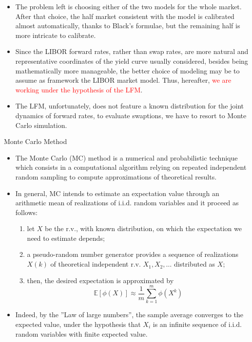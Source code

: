 \documentclass{beamer}
\begin{document}
\begin{frame}
  \begin{itemize}
  \item The problem left is choosing either of the two models for the whole market. After that choice, the half market consistent with the model is calibrated almost automatically, thanks to Black’s formulae, but the remaining half is more intricate to calibrate.
  \item Since the LIBOR forward rates, rather than swap rates, are more natural and representative coordinates of the yield curve usually considered, besides being mathematically more manageable, the better choice of modeling may be to assume as framework the LIBOR market model. Thus, hereafter, \textcolor{red}{we are working under the hypothesis of the LFM}.
  \item The LFM, unfortunately, does not feature a known distribution for the joint dynamics of forward rates, to evaluate swaptions, we have to resort to Monte Carlo simulation.%
  \end{itemize}
\end{frame}

\begin{frame}{Monte Carlo Method}
  \begin{itemize}
  \item The Monte Carlo (MC) method is a numerical and probabilistic technique which consists in a computational algorithm relying on repeated independent random sampling to compute approximations of theoretical results.
  \item In general, MC intends to estimate an expectation value through an arithmetic mean of realizations of i.i.d. random variables and it proceed as follows: 
    \begin{enumerate}
    \item let $X$ be the r.v., with known distribution, on which the expectation we need to estimate depends;
    \item a pseudo-random number generator provides a sequence of realizations $X(k)$ of theoretical independent r.v. $X_1, X_2,\ldots$ distributed as $X$;
    \item then, the desired expectation is approximated by
      \begin{equation*}
	\mathbb{E}[\phi(X)] \approx \frac{1}{m}\sum_{k=1}^m\phi(X^k)
      \end{equation*}
    \end{enumerate}
  \item Indeed, by the ”Law of large numbers”, the sample average converges to the expected value, under the hypothesis that $X_i$ is an infinite sequence of i.i.d. random variables with finite expected value.
  \end{itemize}
\end{frame}
\end{document}
